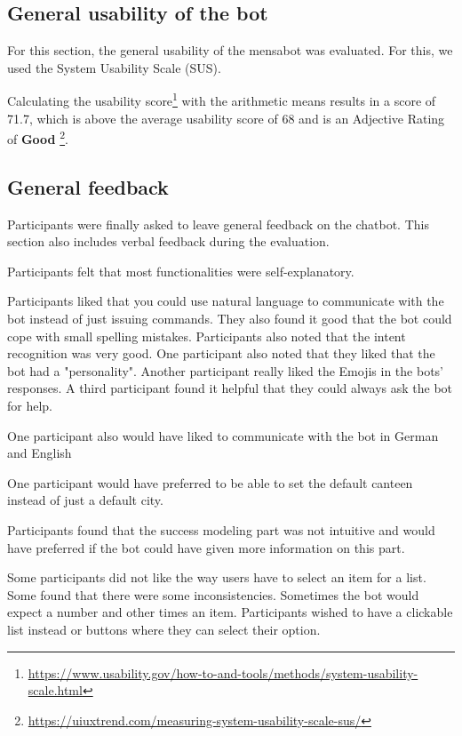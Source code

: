 \subsection{General usability of the bot}
For this section, the general usability of the mensabot was evaluated. For this, we used the System Usability Scale (SUS).


Calculating the usability score\footnote{\label{note1}\url{https://www.usability.gov/how-to-and-tools/methods/system-usability-scale.html}} with the arithmetic means results in a score of 71.7, which is above the average usability score of 68 and is an Adjective Rating of \textbf{Good} \footnote{\url{https://uiuxtrend.com/measuring-system-usability-scale-sus/}}.



\subsection{General feedback}
Participants were finally asked to leave general feedback on the chatbot. This section also includes verbal feedback during the evaluation. 

Participants felt that most functionalities were self-explanatory. 

Participants liked that you could use natural language to communicate with the bot instead of just issuing commands.
They also found it good that the bot could cope with small spelling mistakes.
Participants also noted that the intent recognition was very good.
One participant also noted that they liked that the bot had a "personality". Another participant really liked the Emojis in the bots' responses. A third participant found it helpful that they could always ask the bot for help.

One participant also would have liked to communicate with the bot in German and English

One participant would have preferred to be able to set the default canteen instead of just a default city. 

Participants found that the success modeling part was not intuitive and would have preferred if the bot could have given more information on this part. 

Some participants did not like the way users have to select an item for a list. Some found that there were some inconsistencies. Sometimes the bot would expect a number and other times an item. 
Participants wished to have a clickable list instead or buttons where they can select their option.

